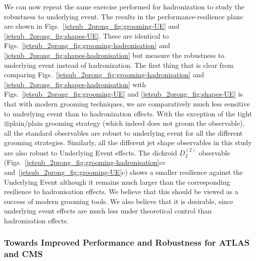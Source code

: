 \documentclass[11pt]{cernrep}
\begin{document}
We can now repeat the same exercise performed for hadronization to study the robustness to underlying event.
%
The results in the performance-resilience plane are shown in Figs.~\ref{jetsub_2prong_fig:grooming-UE} and \ref{jetsub_2prong_fig:shapes-UE}.
%
These are identical to Figs.~\ref{jetsub_2prong_fig:grooming-hadronisation} and \ref{jetsub_2prong_fig:shapes-hadronisation} but measure the robustness to underlying event instead of hadronization.
%
The first thing that is clear from comparing Figs.~\ref{jetsub_2prong_fig:grooming-hadronisation} and \ref{jetsub_2prong_fig:shapes-hadronisation} with  Figs.~\ref{jetsub_2prong_fig:grooming-UE} and \ref{jetsub_2prong_fig:shapes-UE} is that with modern grooming techniques, we are comparatively much less sensitive to underlying event than to hadronization effects.
%
With the exception of the tight$\otimes$plain/plain grooming strategy
(which indeed does not groom the observable), all the standard
observables are robust to underlying event for all the different
grooming strategies. Similarly, all the different jet shape
observables in this study are also robust to Underlying Event
effects. The dichroid $D_2^{(2)}$ observable
(Figs.~\ref{jetsub_2prong_fig:grooming-hadronisation}cc
and~\ref{jetsub_2prong_fig:grooming-UE}c) shows a smaller resilience
against the Underlying Event although it remains much larger than the
corresponding resilience to hadronisation effects.
%
We believe that this should be viewed as a success of modern grooming tools.
%
We also believe that it is desirable, since underlying event effects are much less under theoretical control than hadronization effects. 




\subsubsection{Towards Improved Performance and Robustness for ATLAS and CMS}\label{jetsub_2prong_sec:exp_compare}
\end{document}
